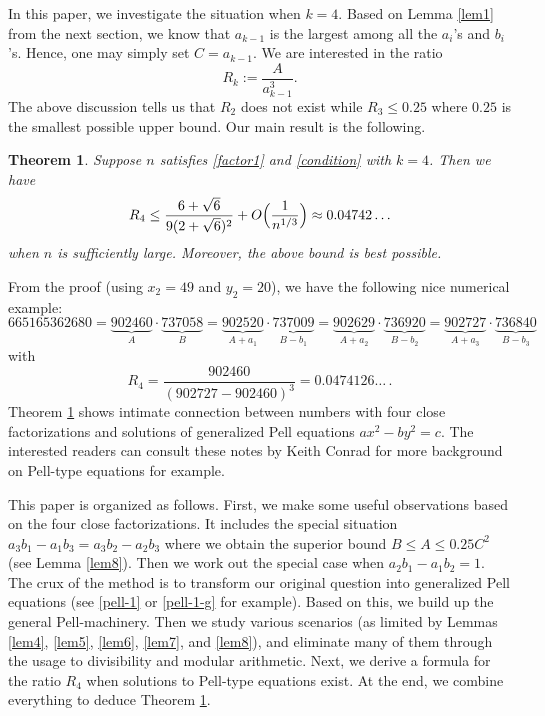 \documentclass[12pt]{article}
\newtheorem{thm}{Theorem}
\begin{document}
In this paper, we investigate the situation when $k = 4$. Based on Lemma \ref{lem1} from the next section, we know that $a_{k-1}$ is the largest among all the $a_i$'s and $b_i$'s. Hence, one may simply set $C = a_{k-1}$. We are interested in the ratio
\[
R_k := \frac{A}{a_{k-1}^3}.
\]
The above discussion tells us that $R_2$ does not exist while $R_3 \le 0.25$ where $0.25$ is the smallest possible upper bound. Our main result is the following.
\begin{thm} \label{thm1}
Suppose $n$ satisfies \eqref{factor1} and \eqref{condition} with $k = 4$. Then we have
\[
R_4 \le \frac{6 + \sqrt{6}}{9 (2 + \sqrt{6})^2} + O \Bigl( \frac{1}{n^{1/3}} \Bigr) \approx 0.04742\ldots
\]
when $n$ is sufficiently large. Moreover, the above bound is best possible.
\end{thm}
\noindent From the proof (using $x_2 = 49$ and $y_2 = 20$), we have the following nice numerical example:
\[
665165362680 = \underbrace{902460}_{A} \cdot \underbrace{737058}_{B} = \underbrace{902520}_{A + a_1} \cdot \underbrace{737009}_{B - b_1} = \underbrace{902629}_{A + a_2} \cdot \underbrace{736920}_{B - b_2} = \underbrace{902727}_{A + a_3} \cdot \underbrace{736840}_{B - b_3}
\]
with
\[
R_4 = \frac{902460}{(902727 - 902460)^3} = 0.0474126\ldots \, .
\]
Theorem \ref{thm1} shows intimate connection between numbers with four close factorizations and solutions of generalized Pell equations $a x^2 - b y^2 = c$. The interested readers can consult these  notes \cite{Co1, Co2} by Keith Conrad for more background on Pell-type equations for example.

\bigskip

This paper is organized as follows. First, we make some useful observations based on the four close factorizations. It includes the special situation $a_3 b_1 - a_1 b_3 = a_3 b_2 - a_2 b_3$ where we obtain the superior bound $B \le A \le 0.25 C^2$ (see Lemma \ref{lem8}). Then we work out the special case when $a_2 b_1 - a_1 b_2 = 1$. The crux of the method is to transform our original question into generalized Pell equations (see \eqref{pell-1} or \eqref{pell-1-g} for example). Based on this, we build up the general Pell-machinery. Then we study various scenarios (as limited by Lemmas \ref{lem4}, \ref{lem5}, \ref{lem6}, \ref{lem7}, and \ref{lem8}), and eliminate many of them through the usage to divisibility and modular arithmetic. Next, we derive a formula for the ratio $R_4$ when solutions to Pell-type equations exist. At the end, we combine everything to deduce Theorem \ref{thm1}.
\end{document}
